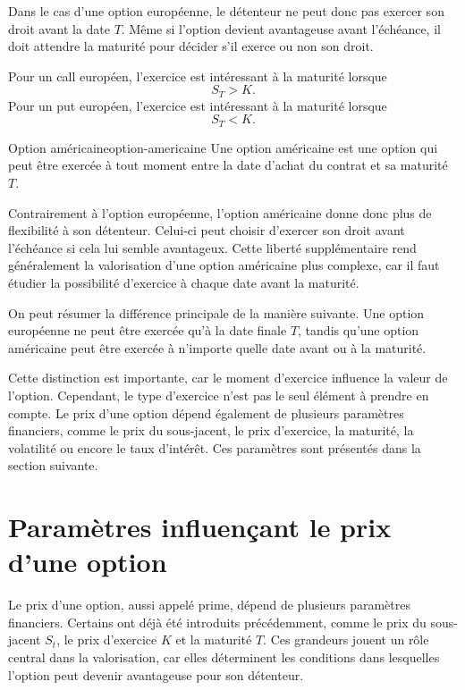 \documentclass[11pt]{report}
\begin{document}
Dans le cas d'une option européenne, le détenteur ne peut donc pas exercer son droit avant la date $T$. Même si l'option devient avantageuse avant l'échéance, il doit attendre la maturité pour décider s'il exerce ou non son droit.

Pour un call européen, l'exercice est intéressant à la maturité lorsque
\[
S_T > K.
\]
Pour un put européen, l'exercice est intéressant à la maturité lorsque
\[
S_T < K.
\]

\begin{definition}{Option américaine}{option-americaine}
Une option américaine est une option qui peut être exercée à tout moment entre la date d'achat du contrat et sa maturité $T$.
\end{definition}

Contrairement à l'option européenne, l'option américaine donne donc plus de flexibilité à son détenteur. Celui-ci peut choisir d'exercer son droit avant l'échéance si cela lui semble avantageux. Cette liberté supplémentaire rend généralement la valorisation d'une option américaine plus complexe, car il faut étudier la possibilité d'exercice à chaque date avant la maturité.

On peut résumer la différence principale de la manière suivante. Une option européenne ne peut être exercée qu'à la date finale $T$, tandis qu'une option américaine peut être exercée à n'importe quelle date avant ou à la maturité.

Cette distinction est importante, car le moment d'exercice influence la valeur de l'option. Cependant, le type d'exercice n'est pas le seul élément à prendre en compte. Le prix d'une option dépend également de plusieurs paramètres financiers, comme le prix du sous-jacent, le prix d'exercice, la maturité, la volatilité ou encore le taux d'intérêt. Ces paramètres sont présentés dans la section suivante.
\section{Paramètres influençant le prix d'une option}

Le prix d'une option, aussi appelé prime, dépend de plusieurs paramètres financiers. Certains ont déjà été introduits précédemment, comme le prix du sous-jacent $S_t$, le prix d'exercice $K$ et la maturité $T$. Ces grandeurs jouent un rôle central dans la valorisation, car elles déterminent les conditions dans lesquelles l'option peut devenir avantageuse pour son détenteur.
\end{document}

